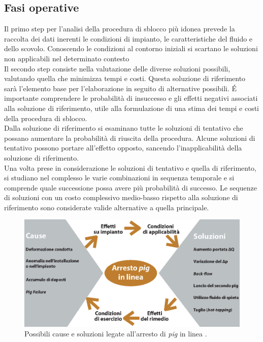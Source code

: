 \subsection{Fasi operative}
Il primo step per l'analisi della procedura di sblocco più idonea prevede la raccolta dei dati inerenti le condizioni di impianto, le caratteristiche del fluido e dello scovolo. Conoscendo le condizioni al contorno iniziali si scartano le soluzioni non applicabili nel determinato contesto\\
Il secondo step consiste nella valutazione delle diverse soluzioni possibili, valutando quella che minimizza tempi e costi. Questa soluzione di riferimento sarà l'elemento base per l'elaborazione in seguito di alternative possibili. \'E importante comprendere le probabilità di insuccesso e gli effetti negativi associati alla soluzione di riferimento, utile alla formulazione di una stima dei tempi e costi della procedura di sblocco.\\
Dalla soluzione di riferimento si esaminano tutte le soluzioni di tentativo che possano aumentare la probabilità di riuscita della procedura. Alcune soluzioni di tentativo possono portare all'effetto opposto, sancendo l'inapplicabilità della soluzione di riferimento.\\
Una volta prese in considerazione le soluzioni di tentativo e quella di riferimento, si studiano nel complesso le varie combinazioni in sequenza temporale e si comprende quale successione possa avere più probabilità di successo. Le sequenze di soluzioni con un costo complessivo medio-basso rispetto alla soluzione di riferimento sono considerate valide alternative a quella principale.

\begin{figure}[htbp]
	\centering
	\includegraphics[width=\textwidth]{fig/pig/blocco.eps}
	\caption{Possibili cause e soluzioni legate all'arresto di \textit{pig} in linea \parencite{diluvio2006questione}.}
	\label{fig:bloccopig}
\end{figure}

